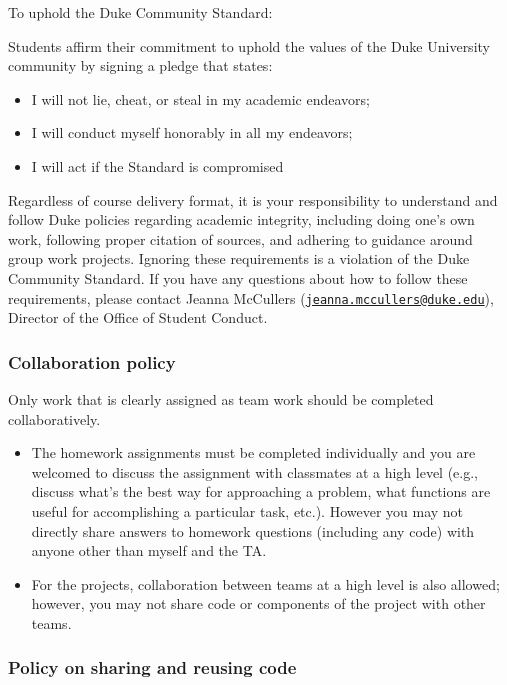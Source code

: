 \documentclass[
  letterpaper,
  DIV=11,
  numbers=noendperiod]{scrartcl}
\providecommand{\tightlist}{%
  \setlength{\itemsep}{0pt}\setlength{\parskip}{0pt}}
\begin{document}
To uphold the Duke Community Standard:

Students affirm their commitment to uphold the values of the Duke
University community by signing a pledge that states:

\begin{itemize}
\tightlist
\item
  I will not lie, cheat, or steal in my academic endeavors;
\item
  I will conduct myself honorably in all my endeavors;
\item
  I will act if the Standard is compromised
\end{itemize}

Regardless of course delivery format, it is your responsibility to
understand and follow Duke policies regarding academic integrity,
including doing one's own work, following proper citation of sources,
and adhering to guidance around group work projects. Ignoring these
requirements is a violation of the Duke Community Standard. If you have
any questions about how to follow these requirements, please contact
Jeanna McCullers
(\href{mailto:jeanna.mccullers@duke.edu}{\nolinkurl{jeanna.mccullers@duke.edu}}),
Director of the Office of Student Conduct.

\hypertarget{collaboration-policy}{%
\subsubsection{Collaboration policy}\label{collaboration-policy}}

Only work that is clearly assigned as team work should be completed
collaboratively.

\begin{itemize}
\tightlist
\item
  The homework assignments must be completed individually and you are
  welcomed to discuss the assignment with classmates at a high level
  (e.g., discuss what's the best way for approaching a problem, what
  functions are useful for accomplishing a particular task, etc.).
  However you may not directly share answers to homework questions
  (including any code) with anyone other than myself and the TA.
\item
  For the projects, collaboration between teams at a high level is also
  allowed; however, you may not share code or components of the project
  with other teams.
\end{itemize}

\hypertarget{policy-on-sharing-and-reusing-code}{%
\subsubsection{Policy on sharing and reusing
code}\label{policy-on-sharing-and-reusing-code}}
\end{document}
